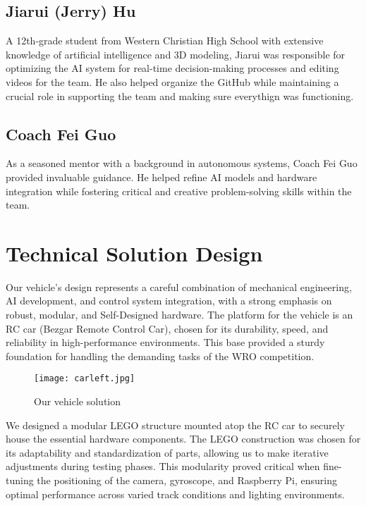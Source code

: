 \documentclass{article}
\begin{document}
\begin{multicols}{2}
\subsection{Jiarui (Jerry) Hu}
A 12th-grade student from Western Christian High School with extensive knowledge of artificial intelligence and 3D modeling, Jiarui was responsible for optimizing the AI system for real-time decision-making processes and editing videos for the team. He also helped organize the GitHub while maintaining a crucial role in supporting the team and making sure everythign was functioning.

\subsection{Coach Fei Guo}
As a seasoned mentor with a background in autonomous systems, Coach Fei Guo provided invaluable guidance. He helped refine AI models and hardware integration while fostering critical and creative problem-solving skills within the team.
        
\section*{Technical Solution Design}
Our vehicle’s design represents a careful combination of mechanical engineering, AI development, and control system integration, with a strong emphasis on robust, modular, and Self-Designed hardware. The platform for the vehicle is an RC car (Bezgar Remote Control Car), chosen for its durability, speed, and reliability in high-performance environments. This base provided a sturdy foundation for handling the demanding tasks of the WRO competition. \par

\begin{figure}[H]
            \centering
            \texttt{[image: carleft.jpg]}
            \caption*{Our vehicle solution}
        \end{figure}

We designed a modular LEGO structure mounted atop the RC car to securely house the essential hardware components. The LEGO construction was chosen for its adaptability and standardization of parts, allowing us to make iterative adjustments during testing phases. This modularity proved critical when fine-tuning the positioning of the camera, gyroscope, and Raspberry Pi, ensuring optimal performance across varied track conditions and lighting environments.



\end{multicols}
\end{document}
